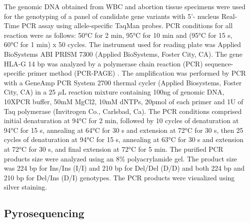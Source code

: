 \documentclass[journal,article,submit,moreauthors,pdftex]{Definitions/mdpi}
\begin{document}
\noindent The genomic DNA obtained from WBC and abortion tissue specimens were used for the genotyping of a panel of candidate gene variants with 5’- nucleus Real-Time PCR assay using allele-specific TaqMan probes. PCR conditions for all reaction were as follows: 50\si{\degree}C for 2 min, 95\si{\degree}C for 10 min and (95\si{\degree}C for 15 s, 60\si{\degree}C for 1 min) x 50 cycles. The instrument used for reading plate was Applied BioSystems ABI PRISM 7300 (Applied BioSystems, Foster City, CA). The gene HLA-G 14 bp was analyzed by a polymerase chain reaction (PCR) sequence-specific primer method (PCR-PAGE) \cite{castelli2014insights}. The amplification was performed by PCR with a GeneAmp PCR System 2700 thermal cycler (Applied Biosystems, Foster City, CA) in a 25 $\mu$L reaction mixture containing 100ng of genomic DNA, 10XPCR buffer, 50mM MgCl2, 10mM dNTPs, 20pmol of each primer and 1U of Taq polymerase (Invitrogen Co., Carlsbad, Ca). The PCR conditions comprised initial denaturation at 94\si{\degree}C for 2 min, followed by 10 cycles of denaturation at 94\si{\degree}C for 15 s, annealing at 64\si{\degree}C for 30 s and extension at 72\si{\degree}C for 30 s, then 25 cycles of denaturation at 94\si{\degree}C for 15 s, annealing at 63\si{\degree}C for 30 s and extension at 72\si{\degree}C for 30 s, and final extension at 72\si{\degree}C for 5 min. The purified PCR products size were analyzed using an 8\% polyacrylamide gel. The product size was 224 bp for Ins/Ins (I/I) and 210 bp for Del/Del (D/D) and both 224 bp and 210 bp for Del/Ins (D/I) genotypes. The PCR products were visualized using silver staining. 

\subsection{Pyrosequencing}
\end{document}
